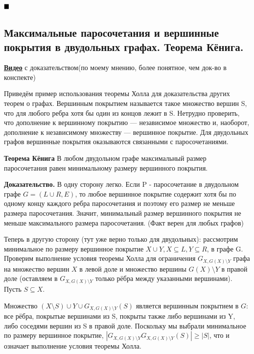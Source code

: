 \documentclass[a4paper, 10pt]{article}
\begin{document}
$\hfill \blacksquare$


\subsection{Максимальные паросочетания и вершинные покрытия в двудольных графах. Теорема Кёнига.}

\href{https://www.coursera.org/lecture/teoriya-grafov/tieoriema-kionigha-iz-tieoriemy-kholla-yUtwO}{\textbf{Видео}} с доказательством(по моему мнению, более понятное, чем док-во в конспекте)

\medskip


Приведём пример использования теоремы Холла для доказательства других теорем о графах. Вершинным покрытием называется такое множество вершин S, что для любого ребра хотя бы один из концов лежит в S. Нетрудно проверить, что дополнение к вершинному покрытию — независимое множество и, наоборот, дополнение к независимому множеству — вершинное покрытие. Для двудольных графов вершинные покрытия оказываются связанными с паросочетаниями.


\medskip

\textbf{Теорема Кёнига} В любом двудольном графе максимальный размер паросочетания равен минимальному размеру вершинного покрытия.


\medskip


\textbf{Доказательство.} В одну сторону легко. Если P - паросочетание в двудольном графе $G =  (L \cup R, E)$, то любое вершинное покрытие содержит хотя бы по одному концу каждого ребра паросочетания и поэтому его размер не меньше размера паросочетания. Значит, минимальный размер вершинного покрытия не меньше максимального размера паросочетания. (Факт верен для любых графов)

Теперь в другую сторону (тут уже верно только для двудольных): рассмотрим минимальное по размеру вершинное покрытие $X \cup Y, X \subseteq L, Y \subseteq R$, в графе G. Проверим выполнение условия теоремы Холла для ограничения $G_{X, G(X) \setminus Y}$ графа на множество вершин $X$ в левой доле и множество вершины $G(X) \setminus Y$ в правой доле (оставляем в $G_{X, G(X) \setminus Y}$ только рёбра между указанными вершинами). Пусть $S \subseteq X$.

\smallskip

Множество $(X \setminus S) \cup Y \cup G_{X, G(X) \setminus Y}(S)$ является вершинным покрытием в $G$: все рёбра, покрытые вершинами из S, покрыты также либо вершинами из Y, либо соседями вершин из S в правой доле. Поскольку мы выбрали минимальное по размеру вершинное покрытие, $|G_{X, G(X) \setminus Y}G_{X, G(X) \setminus Y}(S)| \geqslant |S|$, что и означает выполнение условия теоремы Холла.
\end{document}
